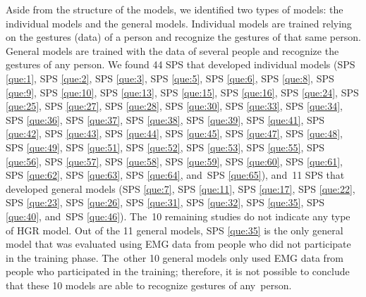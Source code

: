 \documentclass[sensors,review,accept,moreauthors,pdftex]{Definitions/mdpi}
\begin{document}
Aside from the structure of the models, we identified two types of models: the individual models and the general models. Individual models are trained relying on the gestures (data) of a person and recognize the gestures of that same person. General models are trained with the data of several people and recognize the gestures of any person. We found 44 SPS that developed individual models (SPS \ref{que:1}, SPS \ref{que:2}, SPS \ref{que:3}, SPS \ref{que:5}, SPS \ref{que:6}, SPS \ref{que:8}, SPS \ref{que:9}, SPS \ref{que:10}, SPS \ref{que:13}, SPS \ref{que:15}, SPS \ref{que:16}, SPS \ref{que:24}, SPS \ref{que:25}, SPS \ref{que:27}, SPS \ref{que:28}, SPS \ref{que:30}, SPS \ref{que:33}, SPS \ref{que:34}, SPS \ref{que:36}, SPS \ref{que:37}, SPS \ref{que:38}, SPS \ref{que:39}, SPS \ref{que:41}, SPS \ref{que:42}, SPS \ref{que:43}, SPS \ref{que:44}, SPS \ref{que:45}, SPS \ref{que:47}, SPS \ref{que:48}, SPS \ref{que:49}, SPS \ref{que:51}, SPS \ref{que:52}, SPS \ref{que:53}, SPS \ref{que:55}, SPS \ref{que:56}, SPS \ref{que:57}, SPS \ref{que:58}, SPS \ref{que:59}, SPS \ref{que:60}, SPS \ref{que:61}, SPS \ref{que:62}, SPS \ref{que:63}, SPS \ref{que:64}, and~SPS \ref{que:65}), and~11 SPS that developed general models (SPS \ref{que:7}, SPS \ref{que:11}, SPS \ref{que:17}, SPS \ref{que:22}, SPS \ref{que:23}, SPS \ref{que:26}, SPS \ref{que:31}, SPS \ref{que:32}, SPS \ref{que:35}, SPS \ref{que:40}, and~SPS \ref{que:46}). The~10 remaining studies do not indicate any type of HGR model. Out of the 11 general models, SPS \ref{que:35} is the only general model that was evaluated using EMG data from people who did not participate in the training phase. The~other 10 general models only used EMG data from people who participated in the training; therefore, it is not possible to conclude that these 10 models are able to recognize gestures of any~person.
\end{document}
